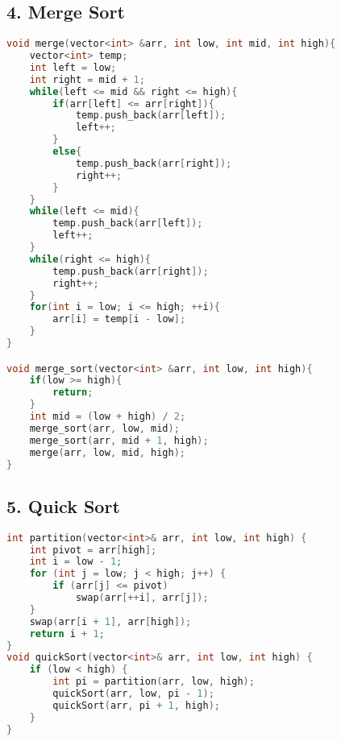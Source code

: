 \subsection*{\textbf{4. Merge Sort}}
\begin{lstlisting}[language=C++, caption=Merge Sort]
void merge(vector<int> &arr, int low, int mid, int high){
    vector<int> temp;
    int left = low;
    int right = mid + 1;
    while(left <= mid && right <= high){
        if(arr[left] <= arr[right]){
            temp.push_back(arr[left]);
            left++;
        }
        else{
            temp.push_back(arr[right]);
            right++;
        }
    }
    while(left <= mid){
        temp.push_back(arr[left]);
        left++;
    }
    while(right <= high){
        temp.push_back(arr[right]);
        right++;
    }
    for(int i = low; i <= high; ++i){
        arr[i] = temp[i - low];
    }
}

void merge_sort(vector<int> &arr, int low, int high){
    if(low >= high){
        return;
    }
    int mid = (low + high) / 2;
    merge_sort(arr, low, mid);
    merge_sort(arr, mid + 1, high);
    merge(arr, low, mid, high);
}
\end{lstlisting}

\subsection*{\textbf{5. Quick Sort}}
\begin{lstlisting}[language=C++, caption=Quick Sort]
int partition(vector<int>& arr, int low, int high) {
    int pivot = arr[high];
    int i = low - 1;
    for (int j = low; j < high; j++) {
        if (arr[j] <= pivot)
            swap(arr[++i], arr[j]);
    }
    swap(arr[i + 1], arr[high]);
    return i + 1;
}
void quickSort(vector<int>& arr, int low, int high) {
    if (low < high) {
        int pi = partition(arr, low, high);
        quickSort(arr, low, pi - 1);
        quickSort(arr, pi + 1, high);
    }
}
\end{lstlisting}
